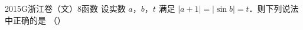 
\begin{problem}{2015}{G}{浙江卷（文）}{8}{函数}
设实数 $ a $，$ b $，$ t $ 满足 $ |a+1| = |\sin b| = t $．则下列说法中正确的是 （\hspace{1cm}）
\begin{choices}
\end{choices}
\end{problem}

\begin{answer}

\end{answer}

\begin{solutions}

\end{solutions}